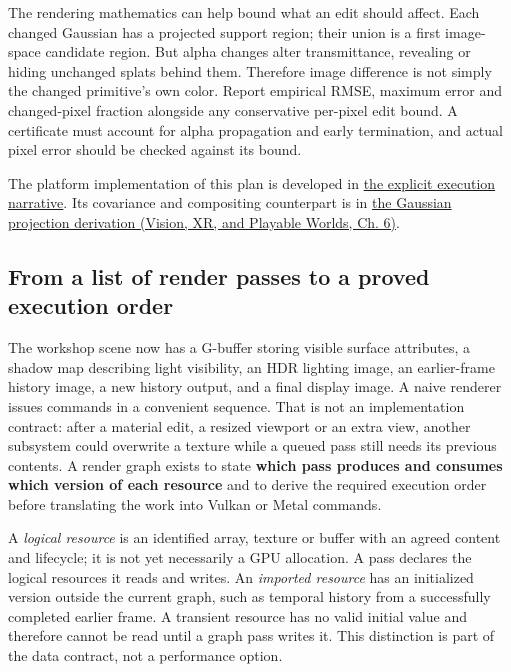 The rendering mathematics can help bound what an edit should affect. Each changed Gaussian has a projected support region; their union is a first image-space candidate region. But alpha changes alter transmittance, revealing or hiding unchanged splats behind them. Therefore image difference is not simply the changed primitive's own color. Report empirical RMSE, maximum error and changed-pixel fraction alongside any conservative per-pixel edit bound. A certificate must account for alpha propagation and early termination, and actual pixel error should be checked against its bound.

The platform implementation of this plan is developed in \hyperref[01-foundations-i-ch011-give-one-image-an-explicit-path-through-the-machine]{the explicit execution narrative}. Its covariance and compositing counterpart is in \href{../07-Vision-XR-and-Playable-Worlds/main.pdf\#nameddest=04-visual-computing-ii-ch037-local-projection-turns-an-ellipsoid-into-a-screen-ellipse}{the Gaussian projection derivation (Vision, XR, and Playable Worlds, Ch. 6)}.

\subsection{From a list of render passes to a proved execution order}\label{06-engine-ii-ch042-from-a-list-of-render-passes-to-a-proved-execution-order}

\hypertarget{06-engine-ii-ch042-from-a-list-of-render-passes-to-a-proved-execution-order}{}

The workshop scene now has a G-buffer storing visible surface attributes, a shadow map describing light visibility, an HDR lighting image, an earlier-frame history image, a new history output, and a final display image. A naive renderer issues commands in a convenient sequence. That is not an implementation contract: after a material edit, a resized viewport or an extra view, another subsystem could overwrite a texture while a queued pass still needs its previous contents. A render graph exists to state \textbf{which pass produces and consumes which version of each resource} and to derive the required execution order before translating the work into Vulkan or Metal commands.

A \emph{logical resource} is an identified array, texture or buffer with an agreed content and lifecycle; it is not yet necessarily a GPU allocation. A pass declares the logical resources it reads and writes. An \emph{imported resource} has an initialized version outside the current graph, such as temporal history from a successfully completed earlier frame. A transient resource has no valid initial value and therefore cannot be read until a graph pass writes it. This distinction is part of the data contract, not a performance option.

